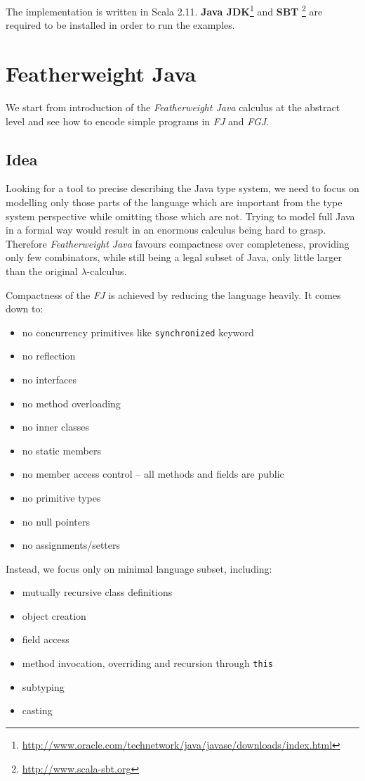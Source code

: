 \documentclass{article}[12pt]
\begin{document}
The implementation is written in Scala 2.11.
\textbf{Java JDK}\footnote{
\url{http://www.oracle.com/technetwork/java/javase/downloads/index.html}
} and \textbf{SBT} \footnote{
\url{http://www.scala-sbt.org}
} are required to be installed in order to run the examples.

\section{Featherweight Java}

We start from introduction of the \emph{Featherweight Java} calculus at
the abstract level and see how to encode simple programs in \emph{FJ}
and \emph{FGJ}.

\subsection{Idea}

Looking for a tool to precise describing the Java type system, we need
to focus on modelling only those parts of the language which are
important from the type system perspective while omitting those
which are not. Trying to model full Java in a formal way would result
in an enormous calculus being hard to grasp. Therefore
\emph{Featherweight Java} favours compactness over completeness,
providing only few combinators, while still being a legal subset
of Java, only little larger than the original $\lambda$-calculus.

Compactness of the \emph{FJ} is achieved by reducing the language
heavily. It comes down to:

\begin{itemize}
\item no concurrency primitives like \texttt{synchronized} keyword
\item no reflection
\item no interfaces
\item no method overloading
\item no inner classes
\item no static members
\item no member access control -- all methods and fields are public
\item no primitive types
\item no null pointers
\item no assignments/setters
\end{itemize}
Instead, we focus only on minimal language subset, including:

\begin{itemize}
\item mutually recursive class definitions
\item object creation
\item field access
\item method invocation, overriding and recursion through \texttt{this}
\item subtyping
\item casting
\end{itemize}
\end{document}

